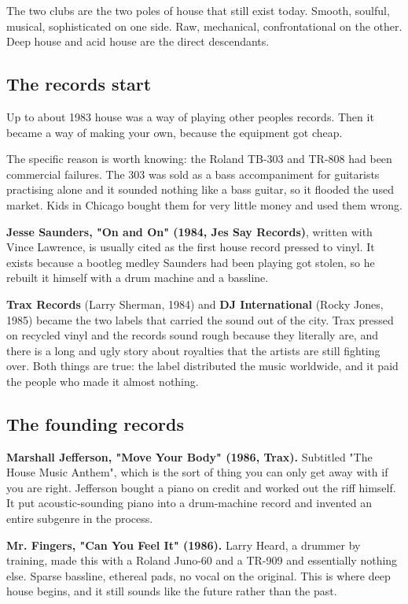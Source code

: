 The two clubs are the two poles of house that still exist today. Smooth, soulful, musical,
sophisticated on one side. Raw, mechanical, confrontational on the other. Deep house and
acid house are the direct descendants.

\subsection{The records start}\label{th02_chicago-the-records-start}

Up to about 1983 house was a way of playing other people\textquotesingle s records. Then it became a way of
making your own, because the equipment got cheap.

The specific reason is worth knowing: the Roland TB-303 and TR-808 had been commercial
failures. The 303 was sold as a bass accompaniment for guitarists practising alone and it
sounded nothing like a bass guitar, so it flooded the used market. Kids in Chicago bought
them for very little money and used them wrong.

\textbf{Jesse Saunders, "On and On" (1984, Jes Say Records)}, written with Vince Lawrence, is
usually cited as the first house record pressed to vinyl. It exists because a bootleg
medley Saunders had been playing got stolen, so he rebuilt it himself with a drum machine
and a bassline.

\textbf{Trax Records} (Larry Sherman, 1984) and \textbf{DJ International} (Rocky Jones, 1985) became
the two labels that carried the sound out of the city. Trax pressed on recycled vinyl and
the records sound rough because they literally are, and there is a long and ugly story
about royalties that the artists are still fighting over. Both things are true: the label
distributed the music worldwide, and it paid the people who made it almost nothing.

\subsection{The founding records}\label{th02_chicago-the-founding-records}

\textbf{Marshall Jefferson, "Move Your Body" (1986, Trax).} Subtitled "The House Music Anthem",
which is the sort of thing you can only get away with if you are right. Jefferson bought a
piano on credit and worked out the riff himself. It put acoustic-sounding piano into a
drum-machine record and invented an entire subgenre in the process.

\textbf{Mr. Fingers, "Can You Feel It" (1986).} Larry Heard, a drummer by training, made this
with a Roland Juno-60 and a TR-909 and essentially nothing else. Sparse bassline, ethereal
pads, no vocal on the original. This is where deep house begins, and it still sounds like
the future rather than the past.

